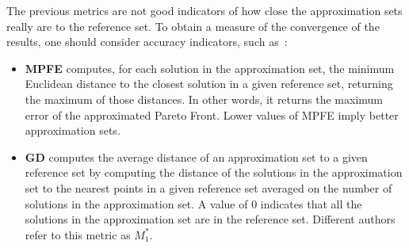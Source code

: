	The previous metrics are not good indicators of how close the approximation sets really are to the reference set. To obtain a measure of the convergence of the results, one should consider accuracy indicators, such as~\cite{Veldhuizen1999GD}:
	\begin{itemize}
		\item \textbf{\ac{MPFE}} computes, for each solution in the approximation set, the minimum Euclidean distance to the closest solution in a given reference set, returning the maximum of those distances. In other words, it returns the maximum error of the approximated Pareto Front. Lower values of \ac{MPFE} imply better approximation sets. 
		\item \textbf{\ac{GD}} computes the average distance of an approximation set to a given reference set by computing the distance of the solutions in the approximation set to the nearest points in a given reference set averaged on the number of solutions in the approximation set. A value of $0$ indicates that all the solutions in the approximation set are in the reference set. Different authors\cite{Zitzler2000m1m3} refer to this metric as \textbf{$M_1^\ast$}.
	\end{itemize}
	
